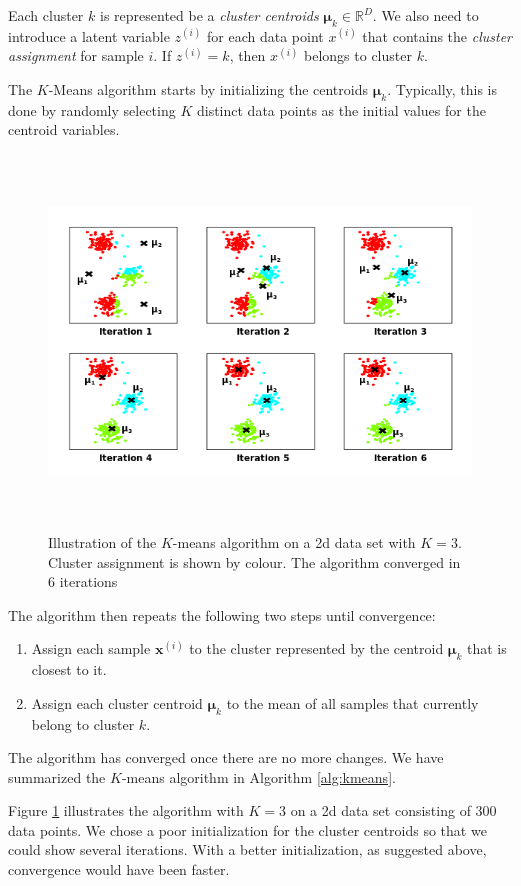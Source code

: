 \documentclass[final,3p,times,twocolumn]{elsarticle}
\let\bs\boldsymbol
\begin{document}
Each cluster $k$ is represented be a \emph{cluster centroids} $\bs\mu_k \in \mathbb{R}^D$.
We also need to introduce a latent variable $z^{(i)}$ for each data point $x^{(i)}$ that contains the \emph{cluster assignment} for sample $i$.
If $z^{(i)} = k$, then $x^{(i)}$ belongs to cluster $k$.

The $K$-Means algorithm starts by initializing the centroids $\boldsymbol \mu_k$.
Typically, this is done by randomly selecting $K$ distinct data points as the initial values for the centroid variables.

\begin{figure}
\centering
\includegraphics[width=\textwidth,height=3.9in]{prog.png}
\caption{Illustration of the $K$-means algorithm on a 2d data set with $K=3$.
Cluster assignment is shown by colour. The algorithm converged in 6 iterations}
\label{fig:kmeans-prog}
\end{figure}

The algorithm then repeats the following two steps until convergence:
\begin{enumerate}
\item Assign each sample $\bs x^{(i)}$ to the cluster represented by the centroid $\bs\mu_k$ that is closest to it.
\item Assign each cluster centroid $\bs\mu_k$ to the mean of all samples that currently belong to cluster $k$.
\end{enumerate}
The algorithm has converged once there are no more changes.
We have summarized the $K$-means algorithm in Algorithm \ref{alg:kmeans}.

Figure \ref{fig:kmeans-prog} illustrates the algorithm with $K=3$ on a 2d data set consisting of 300 data points.
We chose a poor initialization for the cluster centroids so that we could show several iterations. 
With a better initialization, as suggested above, convergence would have been faster.
\end{document}
